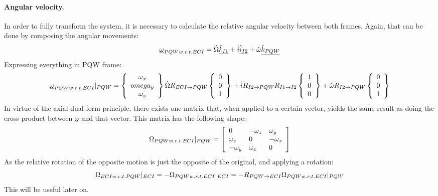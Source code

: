 			\paragraph{Angular velocity. \\}
			\indent In order to fully transform the system, it is necessary to calculate the relative angular velocity between both frames. Again, that can be done by composing the angular movements:
			\[
			\underline{\omega}_{PQW w.r.t. ECI} = \dot{\Omega} \underline{\hat{k}_{I1}} + \dot{i} \underline{\hat{i}_{I2}} + \dot{\omega} \underline{\hat{k}_{PQW}}
			\]
			\indent Expressing everything in PQW frame:
			\[
			\underline{\omega}_{PQW w.r.t. ECI}\rvert_{PQW} = \left\{\begin{array}{c} \omega_x \\ omega_y \\ \omega_z \end{array}\right\}\dot{\Omega} R_{ECI\rightarrow PQW} \left\{\begin{array}{c} 0 \\ 0 \\ 1 \end{array}\right\} + \dot{i} R_{I2 \rightarrow PQW}R_{I1 \rightarrow I2} \left\{\begin{array}{c} 1 \\ 0 \\ 0 \end{array}\right\} + \dot{\omega} R_{I2 \rightarrow PQW} \left\{\begin{array}{c} 0 \\ 0 \\ 1 \end{array}\right\}
			\]
			\indent In virtue of the axial dual form principle, there exists one matrix that, when applied to a certain vector, yields the same result as doing the cross product between $\underline{\omega}$ and that vector. This matrix has the following shape:
			\[
			\Omega_{PQW w.r.t. ECI}\rvert_{PQW} = \left[ \begin{array}{lll}
			0 			& -\omega_z & \omega_y \\
			\omega_z 	& 0 		& -\omega_x \\
			-\omega_y 	& \omega_x 	& 0
			\end{array}\right]
			\]
			\indent As the relative rotation of the opposite motion is just the opposite of the original, and applying a rotation:
			\[
			\Omega_{ECI w.r.t. PQW}\rvert_{ECI} = - \Omega_{PQW w.r.t. ECI}\rvert_{ECI} = - R_{PQW\rightarrow ECI} \Omega_{PQW w.r.t. ECI}\rvert_{PQW}
			\]
			\indent This will be useful later on. 
